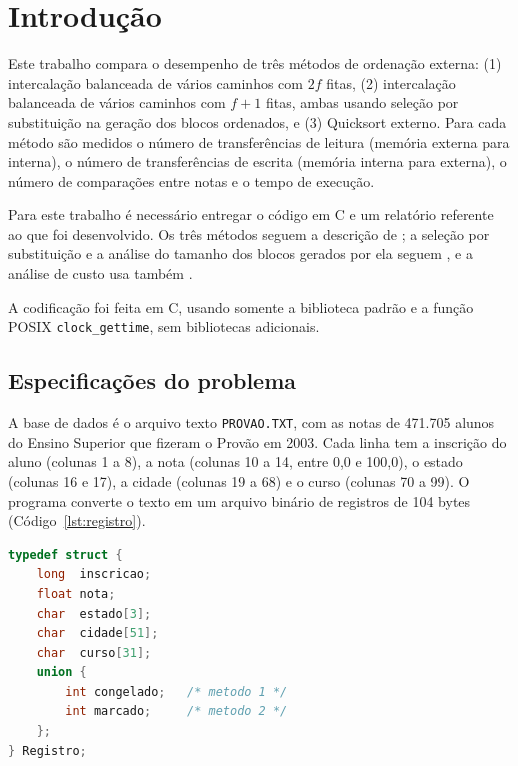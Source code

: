\documentclass{article}
\begin{document}


\section{Introdução}

Este trabalho compara o desempenho de três métodos de ordenação externa: (1) intercalação balanceada de vários caminhos com $2f$ fitas, (2) intercalação balanceada de vários caminhos com $f+1$ fitas, ambas usando seleção por substituição na geração dos blocos ordenados, e (3) Quicksort externo. Para cada método são medidos o número de transferências de leitura (memória externa para interna), o número de transferências de escrita (memória interna para externa), o número de comparações entre notas e o tempo de execução.

Para este trabalho é necessário entregar o código em C e um relatório referente ao que foi desenvolvido. Os três métodos seguem a descrição de \cite{ziviani}; a seleção por substituição e a análise do tamanho dos blocos gerados por ela seguem \cite{knuth1998}, e a análise de custo usa também \cite{cormen2009}.

A codificação foi feita em C, usando somente a biblioteca padrão e a função POSIX \texttt{clock\_gettime}, sem bibliotecas adicionais.

\subsection{Especificações do problema}

A base de dados é o arquivo texto \texttt{PROVAO.TXT}, com as notas de 471.705 alunos do Ensino Superior que fizeram o Provão em 2003. Cada linha tem a inscrição do aluno (colunas 1 a 8), a nota (colunas 10 a 14, entre 0,0 e 100,0), o estado (colunas 16 e 17), a cidade (colunas 19 a 68) e o curso (colunas 70 a 99). O programa converte o texto em um arquivo binário de registros de 104 bytes (Código~\ref{lst:registro}).

\begin{lstlisting}[caption={Definição do registro (registro.h).},label={lst:registro},language=C]
typedef struct {
    long  inscricao;
    float nota;
    char  estado[3];
    char  cidade[51];
    char  curso[31];
    union {
        int congelado;   /* metodo 1 */
        int marcado;     /* metodo 2 */
    };
} Registro;
\end{lstlisting}
\end{document}
